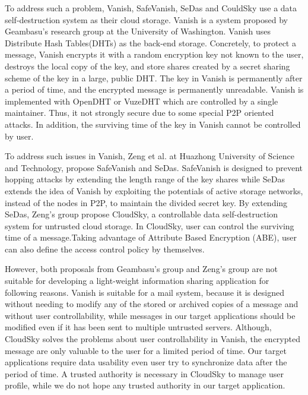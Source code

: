 \documentclass[twocolumn,10pt]{article}
\begin{document}
To address such a problem, Vanish\cite{geambasu2009vanish}, SafeVanish\cite{zeng2010safevanish}, SeDas\cite{zeng2012sedas} and CouldSky\cite{zeng2015cloudsky} use a data self-destruction system as their cloud storage.
Vanish is a system proposed by Geambasu's research group at the University of Washington. 
Vanish uses Distribute Hash Tables(DHTs) as the back-end storage.
Concretely, to protect a message, Vanish encrypts it with a random encryption key not known to the user, destroys the local copy of the key, and store shares created by a secret sharing scheme of the key in a large, public DHT.
The key in Vanish is permanently after a period of time, and the encrypted message is permanently unreadable.
Vanish is implemented with OpenDHT\cite{rhea2005opendht} or VuzeDHT\cite{vuzedht} which are controlled by a single maintainer. 
Thus, it not strongly secure due to some special P2P oriented attacks\cite{wolchok2010defeating}. 
In addition, the surviving time of the key in Vanish cannot be controlled by user. 

To address such issues in Vanish, Zeng et al. at Huazhong University of Science and Technology, propose SafeVanish and SeDas. 
SafeVanish is designed to prevent hopping attacks by extending the length range of the key shares while SeDas extends the idea of Vanish by exploiting the potentials of active storage networks, instead of the nodes in P2P, to maintain the divided secret key. By extending SeDas, Zeng's group propose CloudSky, a controllable data self-destruction system for untrusted cloud storage. 
In CloudSky, user can control the surviving time of a message.Taking advantage of Attribute Based Encryption (ABE), user can also define the access control policy by themselves.

However, both proposals from Geambasu's group and Zeng's group are not suitable for developing a light-weight information sharing application for following reasons. 
Vanish is suitable for a mail system, because it is designed without needing to modify any of the stored or archived copies of a message and without user controllability, while messages in our target applications should be modified even if it has been sent to multiple untrusted servers.  
Although, CloudSky solves the problems about user controllability in Vanish, the encrypted message are only valuable to the user for a limited period of time.
Our target applications require data usability even user try to synchronize data after the period of time. 
A trusted authority is necessary in CloudSky to manage user profile, while we do not hope any trusted authority in our target application.
\end{document}
